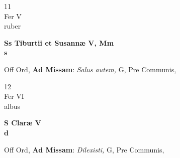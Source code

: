 \documentclass[10pt, openany]{book}
\begin{document}
        \begin{center}
            \begin{minipage}{3.5in}
                \vspace{2em}
                \begin{minipage}{0.5in}
                    {\Huge 11} \\
                    {\normalsize Fer V} \\
                    {\normalsize ruber}
                \end{minipage}
                \begin{minipage}{3.0in}
                    \textbf{ \large Ss Tiburtii et Susannæ V, Mm \\
                    \textnormal{\normalsize s}} \\ 
                \end{minipage}
                \begin{justify}Off Ord, \textbf{Ad Missam}: \textit{Salus autem,} G, Pre Communis,   
                \end{justify}
            \end{minipage}
        \end{center}
    
        \begin{center}
            \begin{minipage}{3.5in}
                \vspace{2em}
                \begin{minipage}{0.5in}
                    {\Huge 12} \\
                    {\normalsize Fer VI} \\
                    {\normalsize albus}
                \end{minipage}
                \begin{minipage}{3.0in}
                    \textbf{ \large S Claræ V \\
                    \textnormal{\normalsize d}} \\ 
                \end{minipage}
                \begin{justify}Off Ord, \textbf{Ad Missam}: \textit{Dilexisti,} G, Pre Communis,   
                \end{justify}
            \end{minipage}
        \end{center}
    
\end{document}
